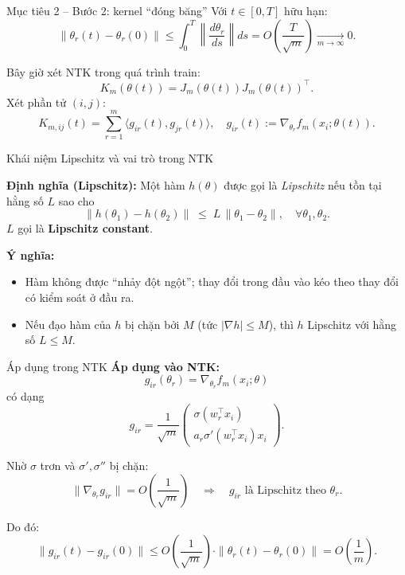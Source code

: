 \documentclass[12pt]{beamer}
\begin{document}
\begin{frame}{Mục tiêu 2 – Bước 2: kernel ``đóng băng''}
  Với $t \in [0,T]$ hữu hạn:
  \[
    \|\theta_r(t) - \theta_r(0)\|
    \le \int_0^T \left\| \frac{d\theta_r}{ds} \right\| ds
    = O\!\left(\frac{T}{\sqrt{m}}\right)
    \xrightarrow[m\to\infty]{} 0.
  \]

  \vspace{0.2cm}
  Bây giờ xét NTK trong quá trình train:
  \[
    K_m(\theta(t)) = J_m(\theta(t))J_m(\theta(t))^\top.
  \]
  Xét phần tử $(i,j)$:
  \[
    K_{m,ij}(t)
      = \sum_{r=1}^m \big\langle g_{ir}(t), g_{jr}(t)\big\rangle,
    \quad
    g_{ir}(t) := \nabla_{\theta_r} f_m(x_i;\theta(t)).
  \]

\end{frame}
\begin{frame}{Khái niệm Lipschitz và vai trò trong NTK}

\textbf{Định nghĩa (Lipschitz):}
Một hàm $h(\theta)$ được gọi là \emph{Lipschitz} nếu tồn tại hằng số $L$ sao cho
\[
  \|h(\theta_1) - h(\theta_2)\|
  \;\le\;
  L \, \|\theta_1 - \theta_2\|,
  \quad \forall\theta_1,\theta_2.
\]
$L$ gọi là \textbf{Lipschitz constant}.

\vspace{0.3cm}
\textbf{Ý nghĩa:}
\begin{itemize}
  \item Hàm không được “nhảy đột ngột”; thay đổi trong đầu vào kéo theo thay đổi có kiểm soát ở đầu ra.
  \item Nếu đạo hàm của $h$ bị chặn bởi $M$ (tức $|\nabla h|\le M$), thì $h$ Lipschitz với hằng số $L\le M$.
\end{itemize}
\end{frame}
\begin{frame}{Áp dụng trong NTK}
\textbf{Áp dụng vào NTK:}
\[
g_{ir}(\theta_r)
= \nabla_{\theta_r} f_m(x_i;\theta)
\]
có dạng
\[
g_{ir} =
\frac{1}{\sqrt{m}}
\begin{pmatrix}
\sigma(w_r^\top x_i) \\
a_r \sigma'(w_r^\top x_i) x_i
\end{pmatrix}.
\]

Nhờ $\sigma$ trơn và $\sigma',\sigma''$ bị chặn:
\[
\|\nabla_{\theta_r} g_{ir}\| = O\!\left(\frac{1}{\sqrt{m}}\right)
\quad\Rightarrow\quad
g_{ir} \text{ là Lipschitz theo }\theta_r.
\]

Do đó:
\[
\|g_{ir}(t) - g_{ir}(0)\|
\le
O\!\left(\frac{1}{\sqrt{m}}\right)
\cdot
\|\theta_r(t)-\theta_r(0)\|
=
O\!\left(\frac{1}{m}\right).
\]
\end{frame}
\end{document}
